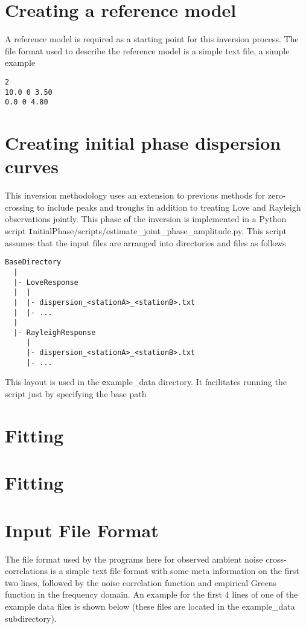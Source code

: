\documentclass{article}
\begin{document}
\section{Creating a reference model}

A reference model is required as a starting point for this inversion process. The file format used
to describe the reference model is a simple text file, a simple example

\begin{verbatim}
2
10.0 0 3.50
0.0 0 4.80
\end{verbatim}

\section{Creating initial phase dispersion curves}

This inversion methodology uses an extension to previous methods for zero-crossing to include peaks and
troughs in addition to treating Love and Rayleigh observations jointly. This phase of the inversion is
implemented in a Python script {\texttt InitialPhase/scripts/estimate\_joint\_phase\_amplitude.py}. This script
assumes that the input files are arranged into directories and files as follows

\begin{verbatim}
BaseDirectory
  |
  |- LoveResponse
  |  |
  |  |- dispersion_<stationA>_<stationB>.txt
  |  |- ...
  |
  |- RayleighResponse
     |
     |- dispersion_<stationA>_<stationB>.txt
     |- ...
\end{verbatim}

This layout is used in the {\texttt example\_data} directory. It facilitates running the script
just by specifying the base path 

\section{Fitting}

\section{Fitting}

  \appendix
  
\section{Input File Format}

The file format used by the programs here for observed ambient noise
cross-correlations is a simple text file format with some meta
information on the first two lines, followed by the noise correlation
function and empirical Greens function in the frequency domain.  An
example for the first 4 lines of one of the example data files is
shown below (these files are located in the example\_data
subdirectory).
\end{document}
